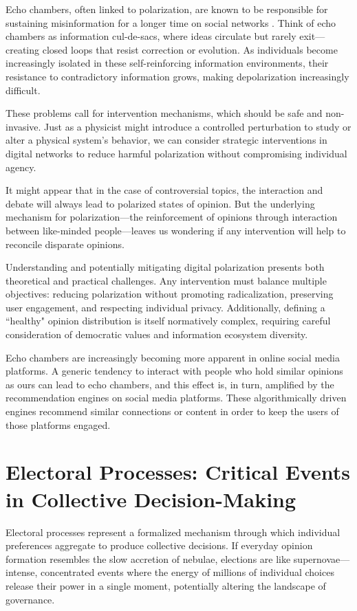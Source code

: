 Echo chambers, often linked to polarization, are known to be responsible for sustaining misinformation for a longer time on social networks \cite{echo-chambers-and-viral-misinformation, the-spreading-of-misinformation-online}. Think of echo chambers as information cul-de-sacs, where ideas circulate but rarely exit—creating closed loops that resist correction or evolution. As individuals become increasingly isolated in these self-reinforcing information environments, their resistance to contradictory information grows, making depolarization increasingly difficult.

These problems call for intervention mechanisms, which should be safe and non-invasive. Just as a physicist might introduce a controlled perturbation to study or alter a physical system's behavior, we can consider strategic interventions in digital networks to reduce harmful polarization without compromising individual agency.

It might appear that in the case of controversial topics, the interaction and debate will always lead to polarized states of opinion. But the underlying mechanism for polarization—the reinforcement of opinions through interaction between like-minded people—leaves us wondering if any intervention will help to reconcile disparate opinions.

Understanding and potentially mitigating digital polarization presents both theoretical and practical challenges. Any intervention must balance multiple objectives: reducing polarization without promoting radicalization, preserving user engagement, and respecting individual privacy. Additionally, defining a ``healthy" opinion distribution is itself normatively complex, requiring careful consideration of democratic values and information ecosystem diversity.

Echo chambers are increasingly becoming more apparent in online social media platforms. A generic tendency to interact with people who hold similar opinions as ours can lead to echo chambers, and this effect is, in turn, amplified by the recommendation engines on social media platforms. These algorithmically driven engines recommend similar connections or content in order to keep the users of those platforms engaged.

\section{Electoral Processes: Critical Events in Collective Decision-Making}
Electoral processes represent a formalized mechanism through which individual preferences aggregate to produce collective decisions. If everyday opinion formation resembles the slow accretion of nebulae, elections are like supernovae—intense, concentrated events where the energy of millions of individual choices release their power in a single moment, potentially altering the landscape of governance.

